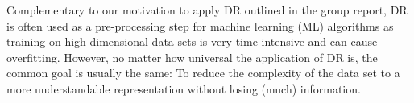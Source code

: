 \documentclass[journal, a4paper]{IEEEtran}
\begin{document}



Complementary to our motivation to apply DR outlined in the group report, DR is often used as a pre-processing step for machine learning (ML) algorithms as training on high-dimensional data sets is very time-intensive and can cause overfitting. However, no matter how universal the application of DR is, the common goal is usually the same: To reduce the complexity of the data set to a more understandable representation without losing (much) information. \\



%


\end{document}
